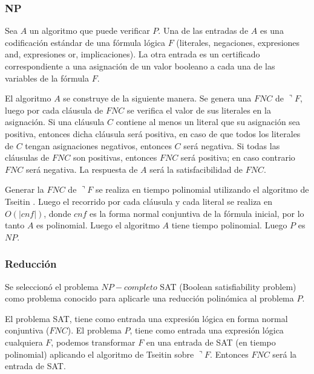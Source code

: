 \documentclass{article}
\begin{document}
        \subsubsection*{NP}

            Sea $A$ un algoritmo que puede verificar $P$. Una de las entradas de $A$ es una 
            codificación estándar de una fórmula lógica $F$ (literales, negaciones, expresiones and, 
            expresiones or, implicaciones). La otra entrada es un certificado correspondiente 
            a una asignación de un valor booleano a cada una de las variables de la fórmula $F$. 

            El algoritmo $A$ se construye de la siguiente manera. Se genera una $FNC$ de $\urcorner F$, luego por 
            cada cláusula de $FNC$ se verifica el valor de sus literales en la asignación. 
            Si una cláusula $C$ contiene al menos un literal que 
            su asignación sea positiva, entonces dicha cláusula será positiva, en caso de que todos los literales
            de $C$ tengan asignaciones negativos, entonces $C$ será negativa. Si todas las cláusulas de $FNC$ 
            son positivas, entonces $FNC$ será positiva; en caso contrario $FNC$ será negativa. La respuesta de $A$
            será la satisfacibilidad de $FNC$. 

            Generar la $FNC$ de $\urcorner F$ se realiza en tiempo polinomial utilizando el algoritmo de Tseitin \cite{Tseitin1970}. 
            Luego 
            el recorrido por cada cláusula y cada literal se realiza en $O(|cnf|)$, donde
            $cnf$ es la forma normal conjuntiva de la fórmula inicial, por lo tanto $A$ es polinomial. 
            Luego el algoritmo $A$ tiene tiempo polinomial. Luego $P$ es $NP$.

        \subsubsection*{Reducción}

            Se seleccionó el problema $NP-completo$ SAT (Boolean satisfiability problem) como problema conocido para 
            aplicarle una reducción polinómica al problema $P$.
            
            El problema SAT, tiene como entrada una expresión lógica en forma normal conjuntiva ($FNC$). El problema $P$, 
            tiene como entrada una expresión lógica cualquiera $F$, podemos transformar $F$ en una entrada de SAT 
            (en tiempo polinomial) aplicando el algoritmo de Tseitin sobre $\urcorner F$. 
            Entonces $FNC$ será la entrada de SAT.
            
\end{document}
